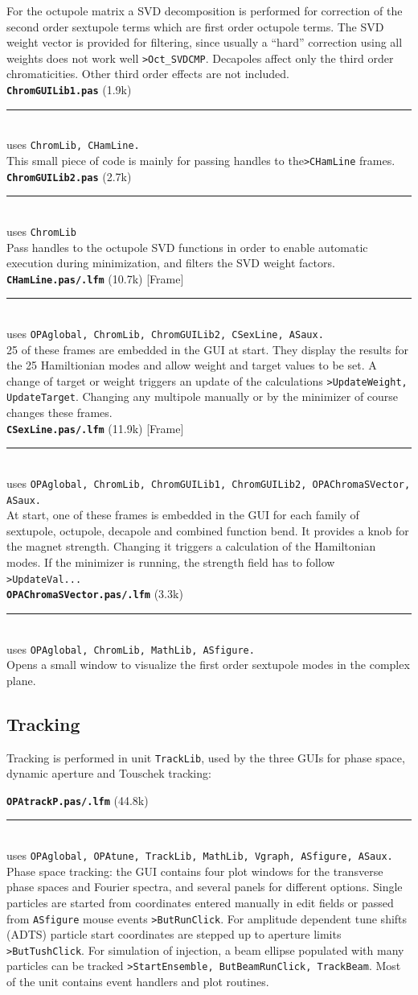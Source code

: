 \documentclass[12pt]{article}
\newcommand\code[1]{{\tt #1}}
\newcommand\opamodule[3]{{\bf \tt #1} #2\\  \rule[3pt]{\textwidth}{0.2pt} \\ {\scriptsize uses \tt  #3}\\[1ex]}
\begin{document}
For the octupole matrix a SVD decomposition is performed for correction of the second order sextupole terms which are first order octupole terms. The SVD weight vector is provided for filtering, since usually a ``hard'' correction using all weights does not work well \code{>Oct\_SVDCMP}.
Decapoles affect only the third order chromaticities. Other third order effects are not included.\\

\opamodule{ChromGUILib1.pas}{(1.9k)}{ChromLib, CHamLine.}
This small piece of code is mainly for passing handles to the\code{>CHamLine} frames.\\

\opamodule{ChromGUILib2.pas}{(2.7k)}{ChromLib}
Pass handles to the octupole SVD functions in order to enable automatic execution during minimization, and filters the SVD weight factors.\\

\opamodule{CHamLine.pas/.lfm}{(10.7k) [Frame]}{OPAglobal, ChromLib, ChromGUILib2, CSexLine, ASaux.}
25 of these frames are embedded in the GUI at start. They display the results for the 25 Hamiltionian modes and allow weight and target values to be set. A change of target or weight triggers an update of the calculations \code{>UpdateWeight, UpdateTarget}. Changing any multipole manually or by the minimizer of course changes these frames.\\

\opamodule{CSexLine.pas/.lfm}{(11.9k) [Frame]}{OPAglobal, ChromLib, ChromGUILib1, ChromGUILib2, OPAChromaSVector, ASaux.}
At start, one of these frames is embedded in the GUI for each family of sextupole, octupole, decapole and combined function bend. It provides a knob for the magnet strength. Changing it triggers a calculation of the Hamiltonian modes. If the minimizer is running, the strength field has to follow \code{>UpdateVal...}\\

\opamodule{OPAChromaSVector.pas/.lfm}{(3.3k)}{OPAglobal, ChromLib, MathLib, ASfigure.}
Opens a small window to visualize the first order sextupole modes in the complex plane.


\subsection{Tracking}
Tracking is performed in unit {\tt TrackLib}, used by the three GUIs for phase space, dynamic aperture and Touschek tracking:

\opamodule{OPAtrackP.pas/.lfm}{(44.8k)}{OPAglobal,  OPAtune, TrackLib, MathLib, Vgraph, ASfigure, ASaux.}
Phase space tracking: the GUI contains four plot windows for the transverse phase spaces and Fourier spectra, and several panels for different options. Single particles are started from coordinates entered manually in edit fields or passed from {\tt ASfigure} mouse events \code{>ButRunClick}. For amplitude dependent tune shifts (ADTS) particle start coordinates are stepped up to aperture limits \code{>ButTushClick}. For simulation of injection, a beam ellipse populated with many particles can be tracked \code{>StartEnsemble, ButBeamRunClick, TrackBeam}. Most of the unit contains event handlers and plot routines.\\
\end{document}
